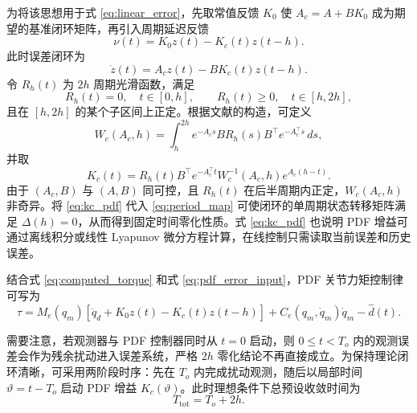 为将该思想用于式 \eqref{eq:linear_error}，先取常值反馈 \(K_0\) 使
\(
A_c=A+BK_0
\)
成为期望的基准闭环矩阵，再引入周期延迟反馈
\begin{equation}
\nu(t)=K_0z(t)-K_c(t)z(t-h).
\label{eq:pdf_error_input}
\end{equation}
此时误差闭环为
\begin{equation}
\dot z(t)=A_cz(t)-BK_c(t)z(t-h).
\label{eq:closed_delay_error}
\end{equation}
令 \(R_h(t)\) 为 \(2h\) 周期光滑函数，满足
\[
R_h(t)=0,\quad t\in[0,h],\qquad
R_h(t)\ge0,\quad t\in[h,2h],
\]
且在 \([h,2h]\) 的某个子区间上正定。根据文献\cite{zhouFixedtimeStabilizationLinear2022}的构造，可定义
\begin{equation}
W_c(A_c,h)=\int_h^{2h}e^{-A_cs}BR_h(s)B^\top e^{-A_c^\top s}\,ds,
\label{eq:wc_matrix}
\end{equation}
并取
\begin{equation}
K_c(t)=R_h(t)B^\top e^{-A_c^\top t}W_c^{-1}(A_c,h)e^{A_c(h-t)}.
\label{eq:kc_pdf}
\end{equation}
由于 \((A_c,B)\) 与 \((A,B)\) 同可控，且 \(R_h(t)\) 在后半周期内正定，\(W_c(A_c,h)\) 非奇异。将 \eqref{eq:kc_pdf} 代入 \eqref{eq:period_map} 可使闭环的单周期状态转移矩阵满足 \(\Delta(h)=0\)，从而得到固定时间零化性质。式 \eqref{eq:kc_pdf} 也说明 PDF 增益可通过离线积分或线性 Lyapunov 微分方程计算，在线控制只需读取当前误差和历史误差。

结合式 \eqref{eq:computed_torque} 和式 \eqref{eq:pdf_error_input}，PDF 关节力矩控制律可写为
\begin{equation}
\tau
=
M_e(q_m)
\left[
\ddot q_d
+
K_0z(t)
-
K_c(t)z(t-h)
\right]
+
C_e(q_m,\dot q_m)\dot q_m
-
\hat d(t).
\label{eq:final_controller}
\end{equation}

需要注意，若观测器与 PDF 控制器同时从 \(t=0\) 启动，则 \(0\le t<T_o\) 内的观测误差会作为残余扰动进入误差系统，严格 \(2h\) 零化结论不再直接成立。为保持理论闭环清晰，可采用两阶段时序：先在 \(T_o\) 内完成扰动观测，随后以局部时间 \(\vartheta=t-T_o\) 启动 PDF 增益 \(K_c(\vartheta)\)。此时理想条件下总预设收敛时间为
\[
T_{\mathrm{tot}}=T_o+2h .
\]



